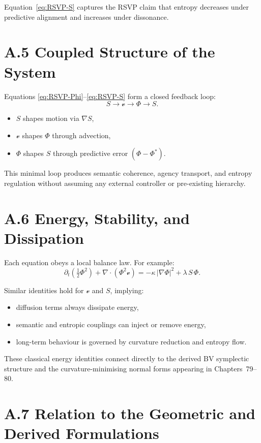 Equation~\eqref{eq:RSVP-S} captures the RSVP claim that entropy decreases under
predictive alignment and increases under dissonance.

\section*{A.5 \; Coupled Structure of the System}

Equations \eqref{eq:RSVP-Phi}--\eqref{eq:RSVP-S} form a closed feedback loop:
\[
S \longrightarrow \mathcal{v}
  \longrightarrow \Phi
  \longrightarrow S.
\]

\begin{itemize}
  \item $S$ shapes motion via $\nabla S$,
  \item $\mathcal{v}$ shapes $\Phi$ through advection,
  \item $\Phi$ shapes $S$ through predictive error $(\Phi-\Phi^\ast)$.
\end{itemize}

This minimal loop produces semantic coherence, agency transport, and entropy
regulation without assuming any external controller or pre-existing hierarchy.

\section*{A.6 \; Energy, Stability, and Dissipation}

Each equation obeys a local balance law.  For example:
\[
\partial_t\!\left(\tfrac{1}{2}\Phi^2\right)
  + \nabla\!\cdot(\Phi^2\mathcal{v})
  = -\kappa\,|\nabla\Phi|^2 + \lambda\,S\,\Phi.
\]

Similar identities hold for $\mathcal{v}$ and $S$, implying:
\begin{itemize}
  \item diffusion terms always dissipate energy,
  \item semantic and entropic couplings can inject or remove energy,
  \item long-term behaviour is governed by curvature reduction and entropy flow.
\end{itemize}

These classical energy identities connect directly to the derived BV symplectic
structure and the curvature-minimising normal forms appearing in Chapters~79–80.

\section*{A.7 \; Relation to the Geometric and Derived Formulations}


